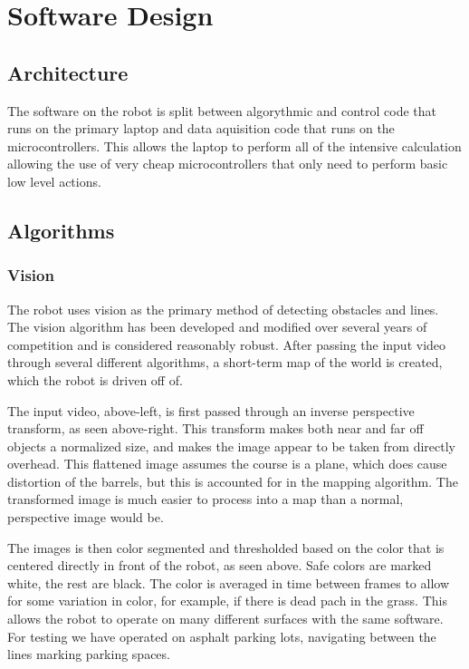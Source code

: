 \section{Software Design}

\subsection{Architecture}

The software on the robot is split between algorythmic and control code that runs on the primary laptop and data aquisition code that runs on the microcontrollers. This allows the laptop to perform all of the intensive calculation allowing the use of very cheap microcontrollers that only need to perform basic low level actions.

\subsection{Algorithms}

\subsubsection{Vision}

The robot uses vision as the primary method of detecting obstacles and lines. The vision algorithm has been developed and modified over several years of competition and is considered reasonably robust. After passing the input video through several different algorithms, a short-term map of the world is created, which the robot is driven off of.

The input video, above-left, is first passed through an inverse perspective transform, as seen above-right. This transform makes both near and far off objects a normalized size, and makes the image appear to be taken from directly overhead. This flattened image assumes the course is a plane, which does cause distortion of the barrels, but this is accounted for in the mapping algorithm. The transformed image is much easier to process into a map than a normal, perspective image would be.

The images is then color segmented and thresholded based on the color that is centered directly in front of the robot, as seen above. Safe colors are marked white, the rest are black. The color is averaged in time between frames to allow for some variation in color, for example, if there is dead pach in the grass. This allows the robot to operate on many different surfaces with the same software. For testing we have operated on asphalt parking lots, navigating between the lines marking parking spaces.

